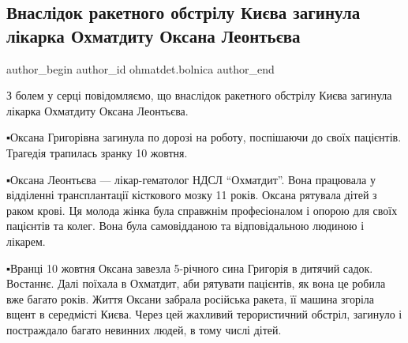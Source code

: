  
 
 
 
 
 
\subsection{Внаслідок ракетного обстрілу Києва загинула лікарка Охматдиту Оксана Леонтьєва}
\label{sec:11_10_2022.fb.ohmatdet.bolnica.1.oksana_leontjeva}
 
\ifcmt
 author_begin
   author_id ohmatdet.bolnica
 author_end
\fi


З болем у серці повідомляємо, що внаслідок ракетного обстрілу Києва загинула
лікарка Охматдиту Оксана Леонтьєва.🙏

▪️Оксана Григорівна загинула по дорозі на роботу, поспішаючи до своїх пацієнтів.
Трагедія трапилась зранку 10 жовтня. 

▪️Оксана Леонтьєва — лікар-гематолог НДСЛ \enquote{Охматдит}. Вона працювала у
відділенні трансплантації кісткового мозку 11 років. Оксана рятувала дітей з
раком крові. Ця молода жінка була справжнім професіоналом і опорою для своїх
пацієнтів та колег. Вона була самовідданою та відповідальною людиною і лікарем. 

▪️Вранці 10 жовтня Оксана завезла 5-річного сина Григорія в дитячий садок.
Востаннє. Далі поїхала в Охматдит, аби рятувати пацієнтів, як вона це робила
вже багато років. Життя Оксани забрала російська ракета, її машина згоріла
вщент в середмісті Києва. Через цей жахливий терористичний обстріл, загинуло і
постраждало багато невинних людей, в тому числі дітей. 

